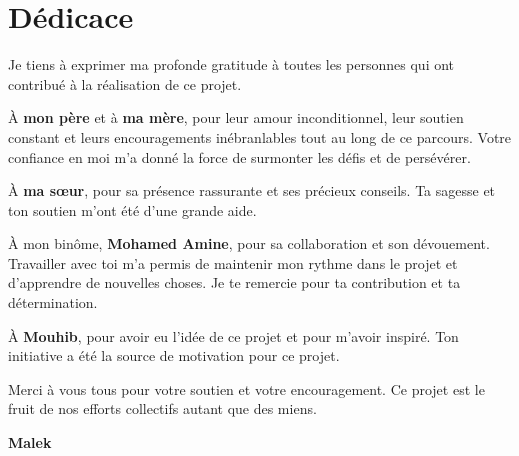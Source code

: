 \thispagestyle{empty}

\chapter*{Dédicace}

Je tiens à exprimer ma profonde gratitude à toutes les personnes qui ont contribué à la réalisation de ce projet.
\vspace{1em}

À \textbf{mon père} et à \textbf{ma mère}, pour leur amour inconditionnel, leur soutien constant et leurs encouragements inébranlables tout au long de ce parcours. Votre confiance en moi m'a donné la force de surmonter les défis et de persévérer.

À \textbf{ma sœur}, pour sa présence rassurante et ses précieux conseils. Ta sagesse et ton soutien m'ont été d'une grande aide.

À mon binôme, \textbf{Mohamed Amine}, pour sa collaboration et son dévouement. Travailler avec toi m'a permis de maintenir mon rythme dans le projet et d'apprendre de nouvelles choses. Je te remercie pour ta contribution et ta détermination.

À \textbf{Mouhib}, pour avoir eu l'idée de ce projet et pour m'avoir inspiré. Ton initiative a été la source de motivation pour ce projet.

Merci à vous tous pour votre soutien et votre encouragement. Ce projet est le fruit de nos efforts collectifs autant que des miens.

\vfill
\hfill \textbf{Malek}